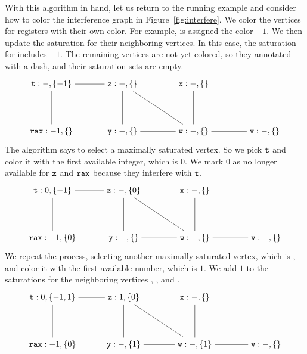 \documentclass[11pt]{book}
\begin{document}
With this algorithm in hand, let us return to the running example and
consider how to color the interference graph in
Figure~\ref{fig:interfere}.
%
We color the vertices for registers with their own color. For example,
 is assigned the color $-1$.  We then update the saturation
for their neighboring vertices.  In this case, the saturation for
 includes $-1$.  The remaining vertices are not yet colored,
so they annotated with a dash, and their saturation sets are empty.
\[
\begin{tikzpicture}[baseline=(current  bounding  box.center)]
\node (rax) at (0,0) {$\ttm{rax}:-1,\{\}$};
\node (t1) at (0,2) {$\ttm{t}:-,\{-1\}$};
\node (z) at (3,2)  {$\ttm{z}:-,\{\}$};
\node (x) at (6,2)  {$\ttm{x}:-,\{\}$};
\node (y) at (3,0)  {$\ttm{y}:-,\{\}$};
\node (w) at (6,0)  {$\ttm{w}:-,\{\}$};
\node (v) at (9,0)  {$\ttm{v}:-,\{\}$};

\draw (t1) to (rax);
\draw (t1) to (z);
\draw (z) to (y);
\draw (z) to (w);
\draw (x) to (w);
\draw (y) to (w);
\draw (v) to (w);
\end{tikzpicture}
\]
The algorithm says to select a maximally saturated vertex. So we pick
$\mathtt{t}$ and color it with the first available integer, which is
$0$. We mark $0$ as no longer available for $\mathtt{z}$ and $\mathtt{rax}$
because they interfere with $\mathtt{t}$.
\[
\begin{tikzpicture}[baseline=(current  bounding  box.center)]
\node (rax) at (0,0) {$\ttm{rax}:-1,\{0\}$};
\node (t1) at (0,2) {$\ttm{t}:0,\{-1\}$};
\node (z) at (3,2)  {$\ttm{z}:-,\{0\}$};
\node (x) at (6,2)  {$\ttm{x}:-,\{\}$};
\node (y) at (3,0)  {$\ttm{y}:-,\{\}$};
\node (w) at (6,0)  {$\ttm{w}:-,\{\}$};
\node (v) at (9,0)  {$\ttm{v}:-,\{\}$};

\draw (t1) to (rax);
\draw (t1) to (z);
\draw (z) to (y);
\draw (z) to (w);
\draw (x) to (w);
\draw (y) to (w);
\draw (v) to (w);
\end{tikzpicture}
\]
We repeat the process, selecting another maximally saturated
vertex, which is , and color it with the first available
number, which is $1$. We add $1$ to the saturations for the
neighboring vertices , , and .
\[
\begin{tikzpicture}[baseline=(current  bounding  box.center)]
\node (rax) at (0,0) {$\ttm{rax}:-1,\{0\}$};
\node (t1) at (0,2) {$\ttm{t}:0,\{-1,1\}$};
\node (z) at (3,2)  {$\ttm{z}:1,\{0\}$};
\node (x) at (6,2)  {$\ttm{x}:-,\{\}$};
\node (y) at (3,0)  {$\ttm{y}:-,\{1\}$};
\node (w) at (6,0)  {$\ttm{w}:-,\{1\}$};
\node (v) at (9,0)  {$\ttm{v}:-,\{\}$};

\draw (t1) to (rax);
\draw (t1) to (z);
\draw (z) to (y);
\draw (z) to (w);
\draw (x) to (w);
\draw (y) to (w);
\draw (v) to (w);
\end{tikzpicture}
\]
\end{document}
